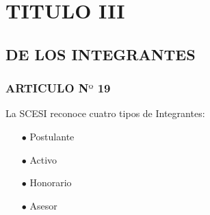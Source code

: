 \documentclass[letterpaper,11pt]{book}
\begin{document}
\section*{TITULO III}
\subsection*{DE LOS INTEGRANTES}
\subsubsection*{ARTICULO N$º$ 19}
La SCESI reconoce cuatro tipos de Integrantes:
\begin{itemize}
	\item[$\bullet$] Postulante 
	\item[$\bullet$] Activo 
	\item[$\bullet$] Honorario 
	\item[$\bullet$] Asesor 
\end{itemize}
\end{document}
